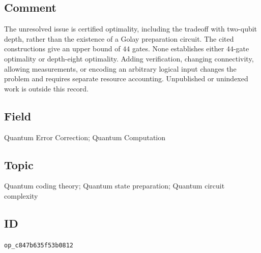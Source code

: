 \subsection*{Comment}

The unresolved issue is certified optimality, including the tradeoff with two-qubit depth, rather than the existence of a Golay preparation circuit. The cited constructions give an upper bound of $44$ gates. None establishes either $44$-gate optimality or depth-eight optimality. Adding verification, changing connectivity, allowing measurements, or encoding an arbitrary logical input changes the problem and requires separate resource accounting. Unpublished or unindexed work is outside this record.

\subsection*{Field}

Quantum Error Correction; Quantum Computation

\subsection*{Topic}

Quantum coding theory; Quantum state preparation; Quantum circuit complexity

\subsection*{ID}

\texttt{op\_c847b635f53b0812}
